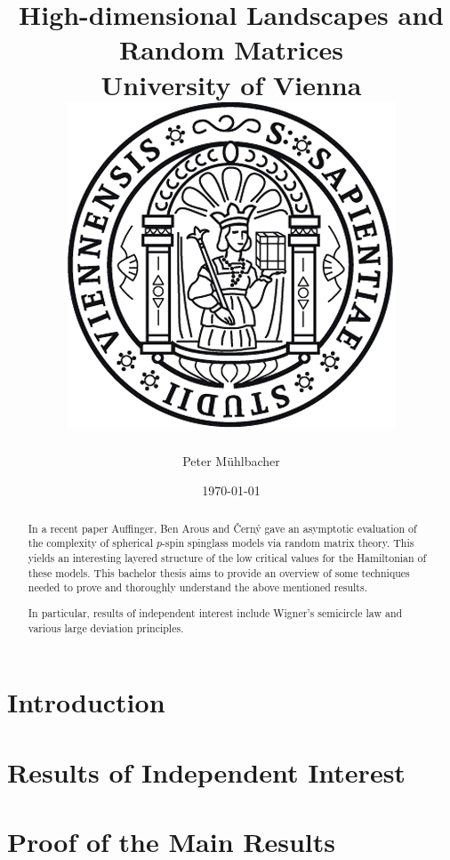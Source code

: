 \documentclass[11pt]{report}
\begin{document}
\title{
	{High-dimensional Landscapes and Random Matrices}\\
	{\large University of Vienna}\\
	\vspace{2ex}
	{\includegraphics{university.png}}
}
\author{Peter Mühlbacher}
\date{\today}
\maketitle

\begin{abstract}
In a recent paper Auffinger, Ben Arous and {\v{C}}ern{\'y} gave an asymptotic evaluation of the complexity of spherical $p$-spin spinglass models via random matrix theory. This yields an interesting layered structure of the low critical values for the Hamiltonian of these models. This bachelor thesis aims to provide an overview of some techniques needed to prove and thoroughly understand the above mentioned results.

In particular, results of independent interest include Wigner's semicircle law and various large deviation principles.
\end{abstract}

\tableofcontents

\chapter*{Introduction}


\chapter{Results of Independent Interest}\label{chap:prerequisites}


\chapter{Proof of the Main Results}\label{chap:centralidentities}




\end{document}
